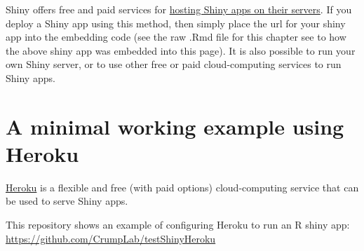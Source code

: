 \documentclass[]{book}
\begin{document}
Shiny offers free and paid services for
\href{https://www.shinyapps.io}{hosting Shiny apps on their servers}. If
you deploy a Shiny app using this method, then simply place the url for
your shiny app into the embedding code (see the raw .Rmd file for this
chapter see to how the above shiny app was embedded into this page). It
is also possible to run your own Shiny server, or to use other free or
paid cloud-computing services to run Shiny apps.

\section{A minimal working example using
Heroku}\label{a-minimal-working-example-using-heroku}

\href{https://www.heroku.com}{Heroku} is a flexible and free (with paid
options) cloud-computing service that can be used to serve Shiny apps.

This repository shows an example of configuring Heroku to run an R shiny
app: \url{https://github.com/CrumpLab/testShinyHeroku}


\end{document}
